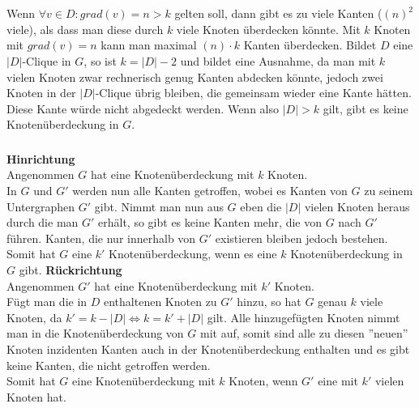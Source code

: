 \documentclass[a4paper]{article}
\begin{document}
	\maketitle
	\section{}
		\subsection{}
		\subsection{}
	\section{}
		\subsubsection{}
			Wenn $\forall v\in D: grad(v)=n>k$ gelten soll, dann gibt es zu viele Kanten ($(n)^2$ viele), als dass man diese durch $k$ viele Knoten überdecken könnte.
			Mit $k$ Knoten mit $grad(v)=n$ kann man maximal $(n)\cdot k$ Kanten überdecken.\n
			Bildet $D$ eine $|D|$-Clique in $G$, so ist $k=|D|-2$ und bildet eine Ausnahme, da man mit $k$ vielen Knoten zwar rechnerisch genug Kanten abdecken könnte, jedoch zwei Knoten in der $|D|$-Clique übrig bleiben, die gemeinsam wieder eine Kante hätten.
			Diese Kante würde nicht abgedeckt werden.\n
			Wenn also $|D|>k$ gilt, gibt es keine Knotenüberdeckung in $G$.
		\subsubsection{}
			\textbf{Hinrichtung}\\
			Angenommen $G$ hat eine Knotenüberdeckung mit $k$ Knoten.\\
			In $G$ und $G'$ werden nun alle Kanten getroffen, wobei es Kanten von $G$ zu seinem Untergraphen $G'$ gibt. Nimmt man nun aus $G$ eben die $|D|$ vielen Knoten heraus durch die man $G'$ erhält, so gibt es keine Kanten mehr, die von $G$ nach $G'$ führen. Kanten, die nur innerhalb von $G'$ existieren bleiben jedoch bestehen.\\
			Somit hat $G$ eine $k'$ Knotenüberdeckung, wenn es eine $k$ Knotenüberdeckung in $G$ gibt.\n
			\textbf{Rückrichtung}\\
			Angenommen $G'$ hat eine Knotenüberdeckung mit $k'$ Knoten.\\
			Fügt man die in $D$ enthaltenen Knoten zu $G'$ hinzu, so hat $G$ genau $k$ viele Knoten, da $k'=k-|D| \Leftrightarrow k=k'+|D|$ gilt.
			Alle hinzugefügten Knoten nimmt man in die Knotenüberdeckung von $G$ mit auf, somit sind alle zu diesen ''neuen'' Knoten inzidenten Kanten auch in der Knotenüberdeckung enthalten und es gibt keine Kanten, die nicht getroffen werden.\\
			Somit hat $G$ eine Knotenüberdeckung mit $k$ Knoten, wenn $G'$ eine mit $k'$ vielen Knoten hat.
\end{document}
